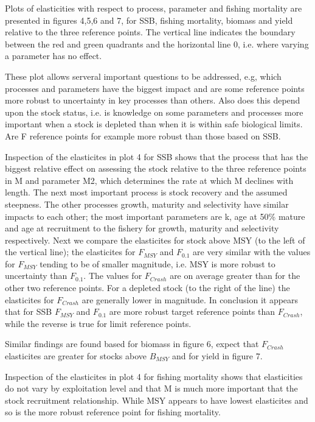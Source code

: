 \documentclass[10pt]{article}
\begin{document}
Plots of elasticities with respect to process, parameter and fishing mortality are presented in figures 4,5,6 and 7, for SSB, fishing mortality, biomass and yield
relative to the three reference points. The vertical line indicates the boundary between the red and green quadrants and the horizontal line 0, i.e. where varying
a parameter has no effect.

These plot allows serveral important questions to be addressed, e.g, which processes and parameters have the biggest impact and are some reference points more 
robust to uncertainty in key processes than others. Also does this depend upon the stock status, i.e. is knowledge on some parameters and processes more
important when a stock is depleted than when it is within safe biological limits. Are F reference points for example more robust than those based on SSB.	

Inspection of the elasticites in plot 4 for SSB shows that the process that has the biggest relative effect on assessing the stock relative to the three
reference points in M and parameter M2, which determines the rate at which M declines with length. The next most important process is  stock recovery
and the assumed steepness. The other processes growth, maturity and selectivity have similar impacts to each other; the most important parameters are k,
age at 50\% mature and age at recruitment to the fishery for growth, maturity and selectivity respectively.
Next we compare the elasticites for stock above MSY (to the left of the vertical line); the elasticites 
for $F_{MSY}$ and $F_{0.1}$ are very similar with the values for $F_ {MSY}$ tending to be of smaller magnitude, i.e. MSY is more robust to uncertainty
than $F_{0.1}$.  The values for $F_{Crash}$ are on average greater than for the other two reference points. For a depleted stock (to the right of the line)
the elasticites for $F_{Crash}$ are generally lower in magnitude. In conclusion it appears that for SSB $F_{MSY}$ and $F_{0.1}$ are more robust target
reference points than  $F_{Crash}$, while the reverse is true for limit reference points.

Similar findings are found based for biomass in figure 6, expect that  $F_{Crash}$ elasticites are greater for stocks above $B_{MSY}$ and 
for yield in figure 7. 


Inspection of the elasticites in plot 4 for fishing mortality shows that elasticities do not vary by exploitation level and that M is much more
important that the stock recruitment relationship. While MSY appears to have lowest elasticites and so is the more robust reference point
for fishing mortality.
 
\end{document}
